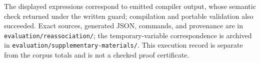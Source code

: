 \label{app:reassociation-record}
The displayed expressions correspond to emitted compiler output, whose
semantic check returned  under the written guard; compilation
and portable validation also succeeded. Exact sources, generated JSON,
commands, and provenance are in \nolinkurl{evaluation/reassociation/};
the temporary-variable correspondence is archived in
\nolinkurl{evaluation/supplementary-materials/}.
This execution record is separate from the corpus totals and is not a
checked proof certificate.
